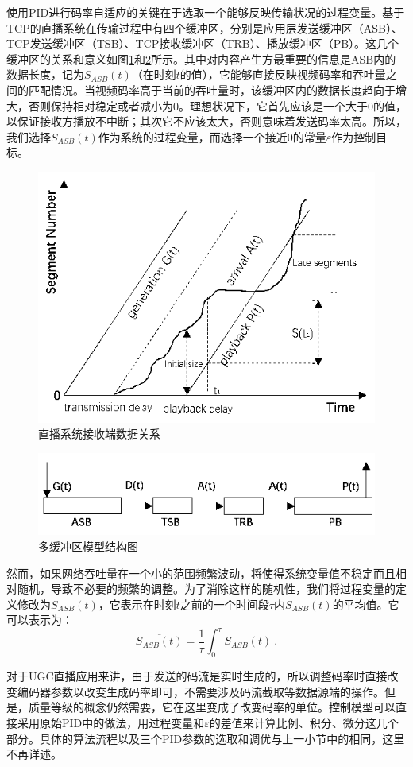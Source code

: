 使用PID进行码率自适应的关键在于选取一个能够反映传输状况的过程变量。基于TCP的直播系统在传输过程中有四个缓冲区，分别是应用层发送缓冲区（ASB）、TCP发送缓冲区（TSB）、TCP接收缓冲区（TRB）、播放缓冲区（PB）。这几个缓冲区的关系和意义如图\ref{fig:20}和\ref{fig:21}所示。其中对内容产生方最重要的信息是ASB内的数据长度，记为$S_{ASB}(t)$（在时刻$t$的值），它能够直接反映视频码率和吞吐量之间的匹配情况。当视频码率高于当前的吞吐量时，该缓冲区内的数据长度趋向于增大，否则保持相对稳定或者减小为0。理想状况下，它首先应该是一个大于0的值，以保证接收方播放不中断；其次它不应该太大，否则意味着发送码率太高。所以，我们选择$S_{ASB}(t)$作为系统的过程变量，而选择一个接近0的常量$\varepsilon$作为控制目标。

\begin{figure}[t]
	\centering
	\includegraphics[width = 0.6\linewidth]{clip/20.png}
	\caption{直播系统接收端数据关系\label{fig:20}}
\end{figure}

\begin{figure}[t]
	\centering
	\includegraphics[width = 0.6\linewidth]{clip/21.png}
	\caption{多缓冲区模型结构图\label{fig:21}}
\end{figure}

然而，如果网络吞吐量在一个小的范围频繁波动，将使得系统变量值不稳定而且相对随机，导致不必要的频繁的调整。为了消除这样的随机性，我们将过程变量的定义修改为$\overline{S_{ASB}(t)}$，它表示在时刻$t$之前的一个时间段$\tau$内$S_{ASB}(t)$的平均值。它可以表示为：
\begin{equation}
\label{eq:asb}
\overline{S_{ASB}(t)} = \dfrac{1}{\tau} \int_0^\tau {S_{ASB}(t)}\: .
\end{equation}

对于UGC直播应用来讲，由于发送的码流是实时生成的，所以调整码率时直接改变编码器参数以改变生成码率即可，不需要涉及码流截取等数据源端的操作。但是，质量等级的概念仍然需要，它在这里变成了改变码率的单位。控制模型可以直接采用原始PID中的做法，用过程变量和$\varepsilon$的差值来计算比例、积分、微分这几个部分。具体的算法流程以及三个PID参数的选取和调优与上一小节中的相同，这里不再详述。

